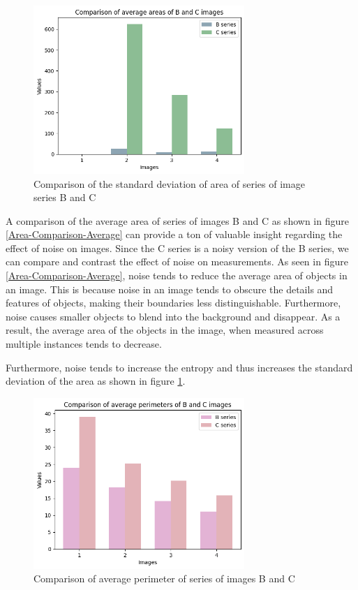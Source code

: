 \documentclass[runningheads]{llncs}
\begin{document}
\begin{figure}
\includegraphics[width=8cm]{Report/Result_Images/bar_plot_3.png}
\centering
\caption{Comparison of the standard deviation of area of series of image series B and C}
\label{Area-Comparison-Standard Deviation}
\end{figure}

A comparison of the average area of series of images B and C as shown in figure \ref{Area-Comparison-Average} can provide a ton of valuable insight regarding the effect of noise on images. Since the C series is a noisy version of the B series, we can compare and contrast the effect of noise on measurements. As seen in figure \ref{Area-Comparison-Average}, noise tends to reduce the average area of objects in an image. This is because noise in an image tends to obscure the details and features of objects, making their boundaries less distinguishable. Furthermore, noise causes smaller objects to blend into the background and disappear. As a result, the average area of the objects in the image, when measured across multiple instances tends to decrease. \newline

Furthermore, noise tends to increase the entropy and thus increases the standard deviation of the area as shown in figure \ref{Area-Comparison-Standard Deviation}.

\begin{figure}
\includegraphics[width=8cm]{Report/Result_Images/barplot_2.png}
\centering
\caption{Comparison of average perimeter of series of images B and C}
\label{Perimeter-Comparison-Average}
\end{figure}
\end{document}

